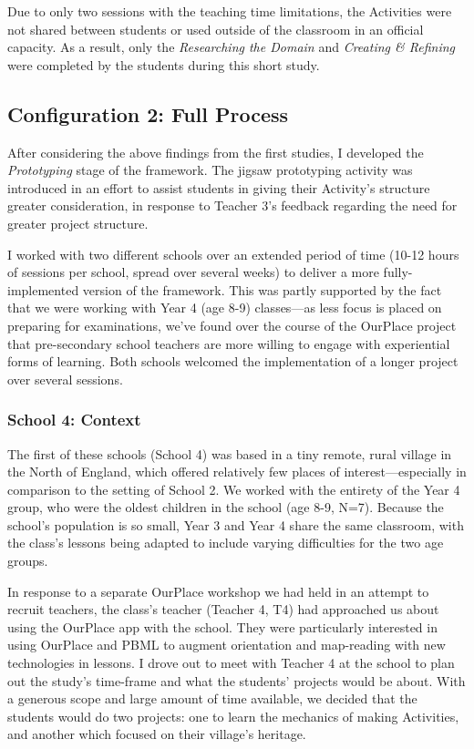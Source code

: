 Due to only two sessions with the teaching time limitations, the Activities were not shared between students or used outside of the classroom in an official capacity. As a result, only the \textit{Researching the Domain} and \textit{Creating \& Refining} were completed by the students during this short study.

\subsection{Configuration 2: Full Process}

After considering the above findings from the first studies, I developed the \textit{Prototyping} stage of the framework. The jigsaw prototyping activity was introduced in an effort to assist students in giving their Activity's structure greater consideration, in response to Teacher 3's feedback regarding the need for greater project structure.

I worked with two different schools over an extended period of time (10-12 hours of sessions per school, spread over several weeks) to deliver a more fully-implemented version of the framework. This was partly supported by the fact that we were working with Year 4 (age 8-9) classes---as less focus is placed on preparing for examinations, we've found over the course of the OurPlace project that pre-secondary school teachers are more willing to engage with experiential forms of learning. Both schools welcomed the implementation of a longer project over several sessions.

\subsubsection{School 4: Context}

The first of these schools (School 4) was based in a tiny remote, rural village in the North of England, which offered relatively few places of interest---especially in comparison to the setting of School 2. We worked with the entirety of the Year 4 group, who were the oldest children in the school (age 8-9, N=7). Because the school's population is so small, Year 3 and Year 4 share the same classroom, with the class's lessons being adapted to include varying difficulties for the two age groups. 

In response to a separate OurPlace workshop we had held in an attempt to recruit teachers, the class's teacher (Teacher 4, T4) had approached us about using the OurPlace app with the school. They were particularly interested in using OurPlace and PBML to augment orientation and map-reading with new technologies in lessons. I drove out to meet with Teacher 4 at the school to plan out the study's time-frame and what the students' projects would be about. With a generous scope and large amount of time available, we decided that the students would do two projects: one to learn the mechanics of making Activities, and another which focused on their village's heritage. 

